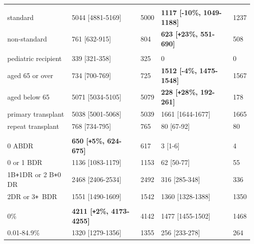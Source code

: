 \documentclass[11pt,twoside,]{book}
\def\Plus{\texttt{+}}
\begin{document}
\begin{table}[h]
{\begin{tabular}{L{3.4cm} R{4cm} L{.9cm} R{4.1cm} L{.9cm}}
\midrule
\addlinespace[0.3em]
\\
\hspace{.7em}standard & 5044   [4881-5169] & 5000 & \textbf{1117   [-10\%, 1049-1188]} & 1237\\
\hspace{.7em}non-standard & 761    [632-915] & 804 & \textbf{623    [\Plus23\%, 551-690]} & 508\\
\addlinespace[0.3em]
\\
\hspace{.7em}pediatric recipient & 339    [321-358] & 325 & 0 & 0\\
\hspace{.7em}aged 65 or over & 734    [700-769] & 725 & \textbf{1512   [-4\%, 1475-1548]} & 1567\\
\hspace{.7em}aged below 65 & 5071   [5034-5105] & 5079 & \textbf{228    [\Plus28\%, 192-261]} & 178\\
\hspace{.7em}primary transplant & 5038   [5001-5068] & 5039 & 1661   [1644-1677] & 1665\\
\hspace{.7em}repeat transplant & 768    [734-795] & 765 & 80     [67-92] & 80\\
\addlinespace[0.3em]
\\
\hspace{.7em}0 ABDR & \textbf{650    [\Plus5\%, 624-675]} & 617 & 3      [1-6] & 4\\
\hspace{.7em}0 or 1 BDR & 1136   [1083-1179] & 1153 & 62     [50-77] & 55\\
\hspace{.7em}1B\Plus1DR or 2 B\Plus0 DR & 2468   [2406-2534] & 2492 & 316    [285-348] & 336\\
\hspace{.7em}2DR or 3\Plus \ BDR & 1551   [1490-1609] & 1542 & 1360   [1328-1388] & 1350\\
\addlinespace[0.3em]
\\
\hspace{.7em}0\% & \textbf{4211   [\Plus2\%, 4173-4255]} & 4142 & 1477   [1455-1502] & 1468\\
\hspace{.7em}0.01-84.9\% & 1320   [1279-1356] & 1355 & 256    [233-278] & 264\\

\end{tabular}}
\end{table}
\end{document}
